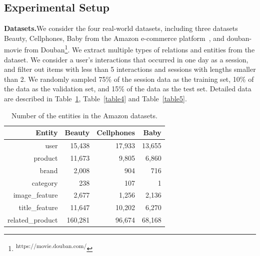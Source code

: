 \documentclass[10pt,journal,compsoc]{IEEEtran}
\begin{document}
\subsection{Experimental Setup}
\textbf{Datasets.}\quad We consider the four real-world datasets, including three datasets Beauty, Cellphones, Baby from the Amazon e-commerce platform~\cite{da_amazon}, and douban-movie from Douban\footnote{\textsuperscript{https://movie.douban.com/}}. We extract multiple types of relations and entities from the dataset. We consider a user's interactions that occurred in one day as a session, and filter out items with less than 5 interactions and sessions with lengths smaller than 2. We randomly sampled 75\% of the session data as the training set, 10\% of the data as the validation set, and 15\% of the data as the test set. Detailed data are described in  Table~\ref{table3}, Table~\ref{table4} and Table~\ref{table5}.

\begin{table}[h]
\centering
\caption{Number of the entities in the Amazon datasets.}
\begin{tabular}{rrrr}
     \hline
     Entity & Beauty & Cellphones & Baby \\
     \hline
     user & 15,438 & 17,933 & 13,655\\ 
     product & 11,673 & 9,805 & 6,860 \\
     brand & 2,008 & 904 & 716  \\
     category & 238 & 107 & 1 \\
     image\_feature & 2,677 &1,256 & 2,136 \\
     title\_feature & 11,647 &10,202 & 6,270 \\
     related\_product & 160,281 & 96,674 & 68,168 \\
     \hline
\end{tabular}
\label{table3}

\end{table}


\begin{table}[h]
\centering
\caption{Number of Entities in the Douban-movie dataset.}
\label{table4}
\end{table}
\end{document}
